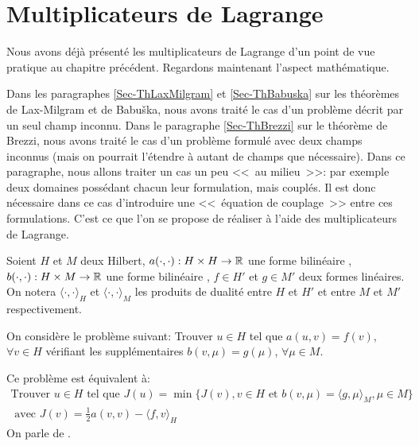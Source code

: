 \medskip



\section{Multiplicateurs de Lagrange}\label{Sec-MultLag}
Nous avons déjà présenté les multiplicateurs de Lagrange d'un point de
vue pratique au chapitre précédent.
Regardons maintenant l'aspect mathématique.

Dans les paragraphes \ref{Sec-ThLaxMilgram} et \ref{Sec-ThBabuska} sur les théorèmes de Lax-Milgram et
de Babuška, nous avons traité le cas d'un problème décrit par un seul champ inconnu.
Dans le paragraphe \ref{Sec-ThBrezzi} sur le théorème de Brezzi, nous avons traité le cas d'un problème formulé
avec deux champs inconnus (mais on pourrait l'étendre à autant de champs
que nécessaire).
Dans ce paragraphe, nous allons traiter un cas un peu <<~au milieu~>>: par exemple
deux domaines possédant chacun leur formulation, mais couplés. Il est donc
nécessaire dans ce cas d'introduire une <<~équation de couplage~>> entre ces
formulations. C'est ce que l'on se propose de réaliser à l'aide des multiplicateurs
de Lagrange.

\medskip
Soient $H$ et $M$ deux Hilbert, $a(\cdot,\cdot): H\times H\rightarrow\mathbb R$ une forme bilinéaire
, $b(\cdot,\cdot): H\times M\rightarrow\mathbb R$ une forme bilinéaire
, $f\in H'$ et $g\in M'$ deux formes linéaires. On notera
$\langle\cdot,\cdot\rangle_H$ et $\langle\cdot,\cdot\rangle_M$ les produits de dualité entre $H$ et $H'$
et entre $M$ et $M'$ respectivement.

On considère le problème suivant:
Trouver $u\in H$ tel que $a(u,v)=f(v)$, $\forall v\in H$  vérifiant les
 supplémentaires $b(v,\mu)=g(\mu)$, $\forall \mu\in M$.

\medskip
Ce problème est équivalent à:
\begin{equation}\label{Eq-Pmin}
\begin{array}{c}
\text{Trouver } u\in H \text{ tel que }
J(u)=\min\{J(v), v\in H \text{ et } b(v,\mu)=\langle g,\mu\rangle_M, \mu\in M\} \\[+3mm]
\text{ avec }
J(v)=\frac12 a(v,v)-\langle f,v\rangle_H
\end{array}
\end{equation}
On parle de .


